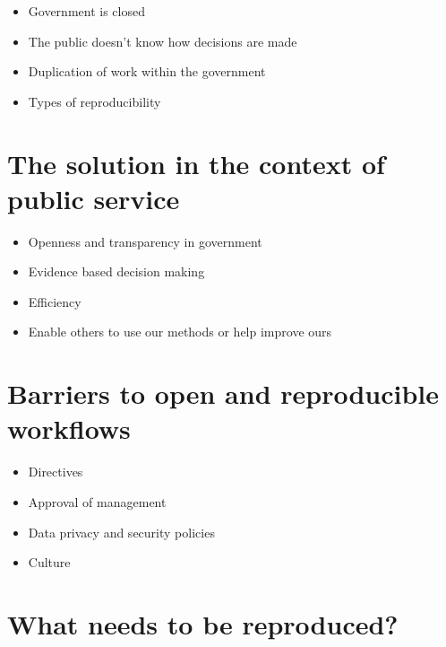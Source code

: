\documentclass[
]{book}
\providecommand{\tightlist}{%
  \setlength{\itemsep}{0pt}\setlength{\parskip}{0pt}}
\begin{document}
\begin{itemize}
\tightlist
\item
  Government is closed\\
\item
  The public doesn't know how decisions are made
\item
  Duplication of work within the government
\item
  Types of reproducibility
\end{itemize}

\hypertarget{the-solution-in-the-context-of-public-service}{%
\section{The solution in the context of public service}\label{the-solution-in-the-context-of-public-service}}

\begin{itemize}
\tightlist
\item
  Openness and transparency in government\\
\item
  Evidence based decision making\\
\item
  Efficiency\\
\item
  Enable others to use our methods or help improve ours
\end{itemize}

\hypertarget{barriers-to-open-and-reproducible-workflows}{%
\section{Barriers to open and reproducible workflows}\label{barriers-to-open-and-reproducible-workflows}}

\begin{itemize}
\tightlist
\item
  Directives\\
\item
  Approval of management\\
\item
  Data privacy and security policies\\
\item
  Culture
\end{itemize}

\hypertarget{what-needs-to-be-reproduced}{%
\section{What needs to be reproduced?}\label{what-needs-to-be-reproduced}}
\end{document}
